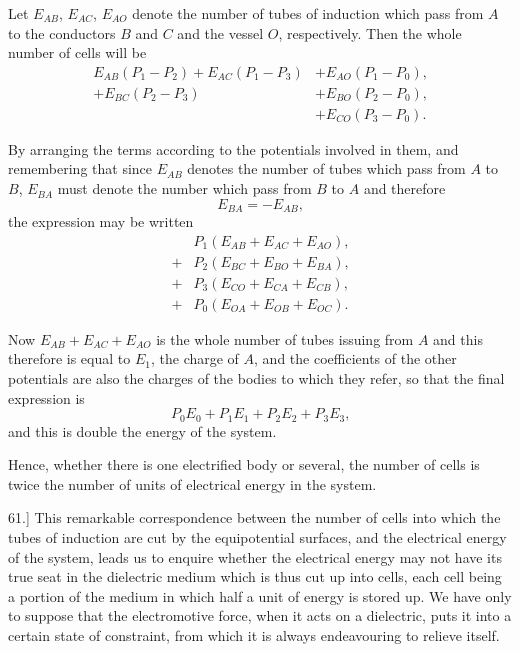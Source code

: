 \documentclass[12pt,oneside]{book}[2021/10/04]
\newcommand{\Runhead}[1]{\fancyhead[C]{\iffloatpage{}{\small#1}}}
\newcommand{\article}[1]{\phantomsection \label{art:#1}{#1.]}}
\newcommand{\¬}{\hphantom{0}}
\begin{document}
Let \(E_{AB}\), \(E_{AC}\), \(E_{AO}\) denote the number of tubes of induction
which pass from \(A\) to the conductors \(B\) and \(C\) and the vessel \(O\),
respectively. Then the whole number of cells will be
\begin{align*}
E_{AB}(P_1 - P_2) + E_{AC}(P_1 - P_3) &+ E_{AO}(P_1 - P_0)\text{,}\\
                  + E_{BC}(P_2 - P_3) &+ E_{BO}(P_2 - P_0)\text{,}\\
                                      &+ E_{CO}(P_3 - P_0)\text{.}
\end{align*}

By arranging the terms according to the potentials involved in
them, and remembering that since \(E_{AB}\) denotes the number of
tubes which pass from \(A\) to \(B\), \(E_{BA}\) must denote the number
which pass from \(B\) to \(A\) and therefore
\[E_{BA} = -E_{AB}\text{,}\]
the expression may be written
\begin{align*}
&P_1(E_{AB} + E_{AC} + E_{AO})\text{,}\\
+ &P_2(E_{BC} + E_{BO} + E_{BA})\text{,}\\
+ &P_3(E_{CO} + E_{CA} + E_{CB})\text{,}\\
+ &P_0(E_{OA} + E_{OB} + E_{OC})\text{.}
\end{align*}

Now \(E_{AB} + E_{AC} + E_{AO}\) is the whole number of tubes issuing from
\(A\) and this therefore is equal to \(E_1\), the charge of \(A\), and the coefficients
of the other potentials are also the charges of the bodies
to which they refer, so that the final expression is
\[P_0E_0 + P_1E_1 + P_2E_2 + P_3E_3\text{,}\]
and this is double the energy of the system.

Hence, whether there is one electrified body or several, the number
of cells is twice the number of units of electrical energy in the
system.

\Runhead{ENERGY OF AN ELECTRIFIED SYSTEM.}
\article{61} This remarkable correspondence between the number of cells
into which the tubes of induction are cut by the equipotential surfaces,
and the electrical energy of the system, leads us to enquire
whether the electrical energy may not have its true seat in the
dielectric medium which is thus cut up into cells, each cell being a
portion of the medium in which half a unit of energy is stored up.
We have only to suppose that the electromotive force, when it acts
on a dielectric, puts it into a certain state of constraint, from which
it is always endeavouring to relieve itself.
\end{document}
